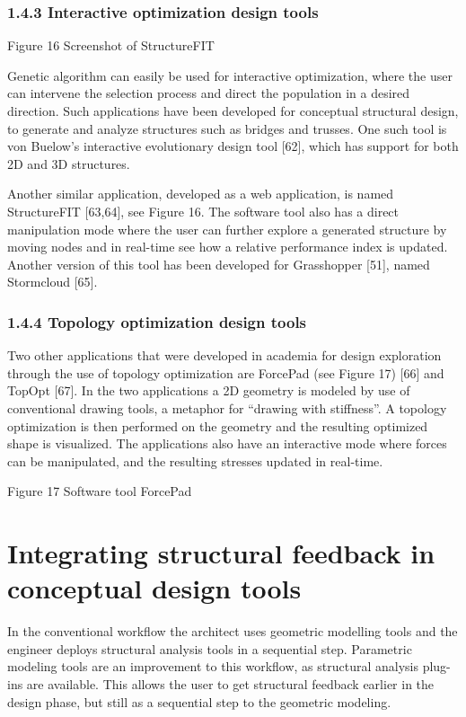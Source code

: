 \subsubsection[1.4.3 Interactive optimization design tools]{1.4.3 Interactive optimization design tools}


Figure 16 Screenshot of StructureFIT

Genetic algorithm can easily be used for interactive optimization, where the user can intervene the selection process and direct the population in a desired direction. Such applications have been developed for conceptual structural design, to generate and analyze structures such as bridges and trusses. One such tool is von Buelow’s interactive evolutionary design tool [62], which has support for both 2D and 3D structures.

Another similar application, developed as a web application, is named StructureFIT [63,64], see Figure 16. The software tool also has a direct manipulation mode where the user can further explore a generated structure by moving nodes and in real-time see how a relative performance index is updated. Another version of this tool has been developed for Grasshopper [51], named Stormcloud [65].


\subsubsection[1.4.4 Topology optimization design tools]{1.4.4 Topology optimization design tools}
Two other applications that were developed in academia for design exploration through the use of topology optimization are ForcePad (see Figure 17) [66] and TopOpt [67]. In the two applications a 2D geometry is modeled by use of conventional drawing tools, a metaphor for “drawing with stiffness”. A topology optimization is then performed on the geometry and the resulting optimized shape is visualized. The applications also have an interactive mode where forces can be manipulated, and the resulting stresses updated in real-time.


Figure 17 Software tool ForcePad



\section{Integrating structural feedback in conceptual design tools}
In the conventional workflow the architect uses geometric modelling tools and the engineer deploys structural analysis tools in a sequential step. Parametric modeling tools are an improvement to this workflow, as structural analysis plug-ins are available. This allows the user to get structural feedback earlier in the design phase, but still as a sequential step to the geometric modeling.



